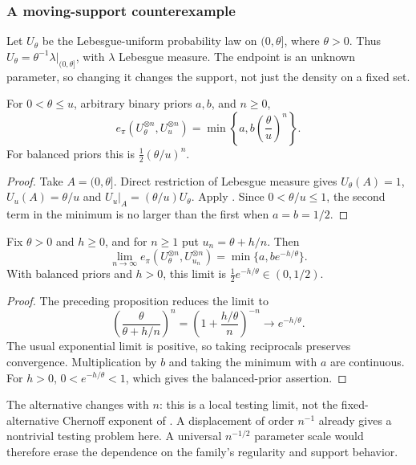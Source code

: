 \subsubsection{A moving-support counterexample}
\label{sec:moving-support}

Let $U_\theta$ be the Lebesgue-uniform probability law on $(0,\theta]$,
where $\theta>0$. Thus
$U_\theta=\theta^{-1}\lambda|_{(0,\theta]}$, with $\lambda$
Lebesgue measure. The endpoint is an unknown parameter, so changing it
changes the support, not just the density on a fixed set.

\begin{proposition}
\label{prop:uniform-testing-error}
For $0<\theta\le u$, arbitrary binary priors $a,b$, and $n\ge0$,
\[
 e_\pi(U_\theta^{\otimes n},U_u^{\otimes n})
 =\min\left\{a,b\left(\frac\theta u\right)^n\right\}.
\]
For balanced priors this is
$\tfrac12(\theta/u)^n$.
\end{proposition}
\begin{proof}
Take $A=(0,\theta]$. Direct restriction of Lebesgue measure gives
$U_\theta(A)=1$, $U_u(A)=\theta/u$ and
$U_u|_A=(\theta/u)U_\theta$.
Apply . Since $0<\theta/u\le1$,
the second term in the minimum is no larger than the first when
$a=b=1/2$.
\end{proof}

\begin{theorem}
\label{thm:uniform-local-scale}
Fix $\theta>0$ and $h\ge0$, and for $n\ge1$ put
$u_n=\theta+h/n$. Then
\[
 \lim_{n\to\infty}e_\pi(U_\theta^{\otimes n},U_{u_n}^{\otimes n})
 =\min\{a,b e^{-h/\theta}\}.
\]
With balanced priors and $h>0$, this limit is
$\tfrac12 e^{-h/\theta}\in(0,1/2)$.
\end{theorem}
\begin{proof}
The preceding proposition reduces the limit to
\[
 \left(\frac{\theta}{\theta+h/n}\right)^n
 =\left(1+\frac{h/\theta}{n}\right)^{-n}
 \longrightarrow e^{-h/\theta}.
\]
The usual exponential limit is positive, so taking reciprocals
preserves convergence. Multiplication by $b$ and taking the minimum
with $a$ are continuous. For $h>0$, $0<e^{-h/\theta}<1$,
which gives the balanced-prior assertion.
\end{proof}

The alternative changes with $n$: this is a local testing limit,
not the fixed-alternative Chernoff exponent of
. A displacement of order $n^{-1}$
already gives a nontrivial testing problem here. A universal
$n^{-1/2}$ parameter scale would therefore erase the dependence on
the family's regularity and support behavior.
